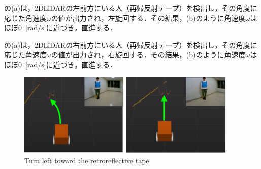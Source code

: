   の(a)は，2DLiDARの左前方にいる人（再帰反射テープ）を検出し，その角度に応じた角速度$\omega$の値が出力され，左旋回する．その結果，(b)のように角速度$\omega$はほぼ0 \,[rad/s]に近づき，直進する．

  の(a)は，2DLiDARの右前方にいる人（再帰反射テープ）を検出し，その角度に応じた角速度$\omega$の値が出力され，右旋回する．その結果，(b)のように角速度$\omega$はほぼ0 \,[rad/s]に近づき，直進する．

\begin{figure}[h]
  \centering
  \begin{minipage}[c]{65mm} 
      \centering
      \includegraphics[height=40mm]{images/pdf/RobotGuidance_learning_turn_left_(a)}
  \end{minipage}
  \begin{minipage}[c]{65mm} 
      \centering
      \includegraphics[height=40mm]{images/pdf/RobotGuidance_learning_turn_left_(b)}
  \end{minipage}
  \caption{Turn left toward the retroreflective tape}
  \label{Fig:RobotGuidance_learning_turn_left}
\end{figure}

